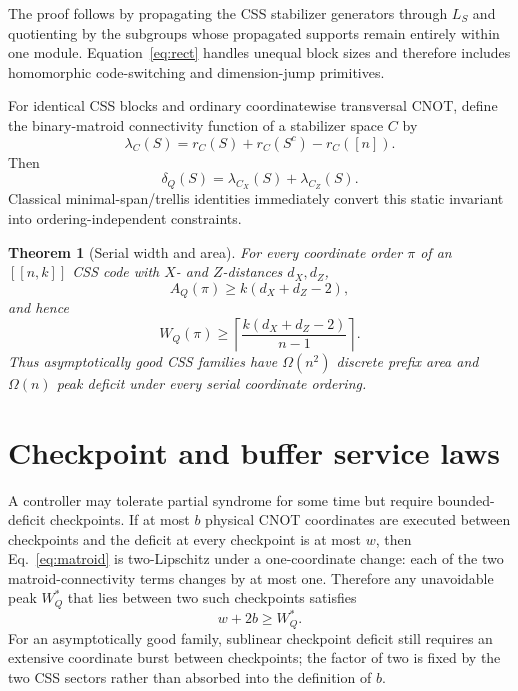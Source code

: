 \documentclass[aps,prx,reprint,superscriptaddress,nofootinbib,longbibliography,floatfix]{revtex4-2}
\newtheorem{theorem}{Theorem}
\begin{document}
The proof follows by propagating the CSS stabilizer generators through $L_S$ and quotienting by the subgroups whose propagated supports remain entirely within one module. Equation~\eqref{eq:rect} handles unequal block sizes and therefore includes homomorphic code-switching and dimension-jump primitives.

For identical CSS blocks and ordinary coordinatewise transversal CNOT, define the binary-matroid connectivity function of a stabilizer space $C$ by
\begin{equation}
\lambda_C(S)=r_C(S)+r_C(S^c)-r_C([n]).
\end{equation}
Then
\begin{equation}
\delta_Q(S)=\lambda_{C_X}(S)+\lambda_{C_Z}(S).
\label{eq:matroid}
\end{equation}
Classical minimal-span/trellis identities immediately convert this static invariant into ordering-independent constraints.

\begin{theorem}[Serial width and area]
For every coordinate order $\pi$ of an $[[n,k]]$ CSS code with $X$- and $Z$-distances $d_X,d_Z$,
\begin{equation}
A_Q(\pi)\ge k(d_X+d_Z-2),
\end{equation}
and hence
\begin{equation}
W_Q(\pi)\ge \left\lceil\frac{k(d_X+d_Z-2)}{n-1}\right\rceil.
\end{equation}
Thus asymptotically good CSS families have $\Omega(n^2)$ discrete prefix area and $\Omega(n)$ peak deficit under every serial coordinate ordering.
\end{theorem}

\section{Checkpoint and buffer service laws}
A controller may tolerate partial syndrome for some time but require bounded-deficit checkpoints. If at most $b$ physical CNOT coordinates are executed between checkpoints and the deficit at every checkpoint is at most $w$, then Eq.~\eqref{eq:matroid} is two-Lipschitz under a one-coordinate change: each of the two matroid-connectivity terms changes by at most one. Therefore any unavoidable peak $W_Q^*$ that lies between two such checkpoints satisfies
\begin{equation}
\boxed{w+2b\ge W_Q^*.}
\end{equation}
For an asymptotically good family, sublinear checkpoint deficit still requires an extensive coordinate burst between checkpoints; the factor of two is fixed by the two CSS sectors rather than absorbed into the definition of $b$.
\end{document}
